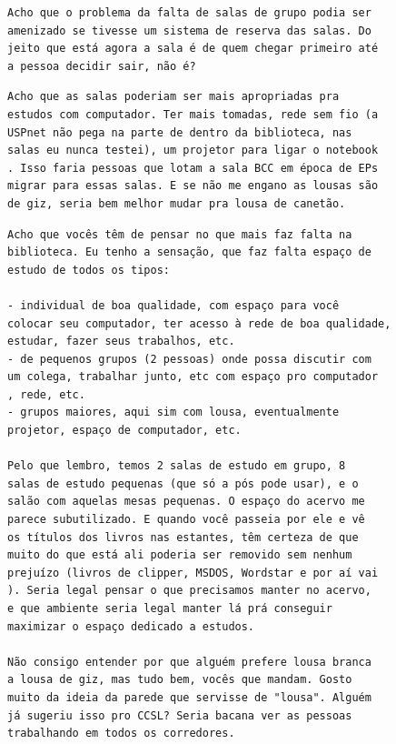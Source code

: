 \documentclass[titlepage]{article}
\begin{document}
\begin{lstlisting}[caption=Enviado por Gustavo Estrela]
Acho que o problema da falta de salas de grupo podia ser 
amenizado se tivesse um sistema de reserva das salas. Do 
jeito que está agora a sala é de quem chegar primeiro até 
a pessoa decidir sair, não é?
\end{lstlisting}

\begin{lstlisting}[caption=Enviado por Gustavo Silva]
Acho que as salas poderiam ser mais apropriadas pra 
estudos com computador. Ter mais tomadas, rede sem fio (a 
USPnet não pega na parte de dentro da biblioteca, nas 
salas eu nunca testei), um projetor para ligar o notebook
. Isso faria pessoas que lotam a sala BCC em época de EPs 
migrar para essas salas. E se não me engano as lousas são 
de giz, seria bem melhor mudar pra lousa de canetão.
\end{lstlisting}

\begin{lstlisting}[caption=Enviado por Carlos E. Ferreira]
Acho que vocês têm de pensar no que mais faz falta na 
biblioteca. Eu tenho a sensação, que faz falta espaço de 
estudo de todos os tipos: 

- individual de boa qualidade, com espaço para você 
colocar seu computador, ter acesso à rede de boa qualidade,
estudar, fazer seus trabalhos, etc. 
- de pequenos grupos (2 pessoas) onde possa discutir com 
um colega, trabalhar junto, etc com espaço pro computador
, rede, etc. 
- grupos maiores, aqui sim com lousa, eventualmente 
projetor, espaço de computador, etc. 

Pelo que lembro, temos 2 salas de estudo em grupo, 8 
salas de estudo pequenas (que só a pós pode usar), e o 
salão com aquelas mesas pequenas. O espaço do acervo me 
parece subutilizado. E quando você passeia por ele e vê 
os títulos dos livros nas estantes, têm certeza de que 
muito do que está ali poderia ser removido sem nenhum 
prejuízo (livros de clipper, MSDOS, Wordstar e por aí vai
). Seria legal pensar o que precisamos manter no acervo, 
e que ambiente seria legal manter lá prá conseguir 
maximizar o espaço dedicado a estudos. 

Não consigo entender por que alguém prefere lousa branca 
a lousa de giz, mas tudo bem, vocês que mandam. Gosto 
muito da ideia da parede que servisse de "lousa". Alguém 
já sugeriu isso pro CCSL? Seria bacana ver as pessoas 
trabalhando em todos os corredores.
\end{lstlisting}
\end{document}

